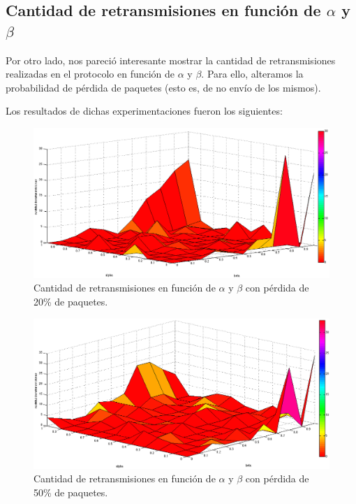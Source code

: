 \documentclass[10pt, a4paper]{article}
\begin{document}

\newpage
\subsection{Cantidad de retransmisiones en función de $\alpha$ y $\beta$}
Por otro lado, nos pareció interesante mostrar la cantidad de retransmisiones realizadas en el protocolo en función de $\alpha$ y $\beta$. Para ello, alteramos la probabilidad de pérdida de paquetes (esto es, de no envío de los mismos). 

Los resultados de dichas experimentaciones fueron los siguientes:
\begin{figure}[H]
\begin{center}
\includegraphics[width=17cm]{alphaBetaRetransmision0,2.png}
\caption{Cantidad de retransmisiones en función de $\alpha$ y $\beta$ con pérdida de 20\% de paquetes.}
\end{center}
\end{figure}

\begin{figure}[H]
\begin{center}
\includegraphics[width=17cm]{alphaBetaRetransmision0,5.png}
\caption{Cantidad de retransmisiones en función de $\alpha$ y $\beta$ con pérdida de 50\% de paquetes.}
\end{center}
\end{figure}
\end{document}
